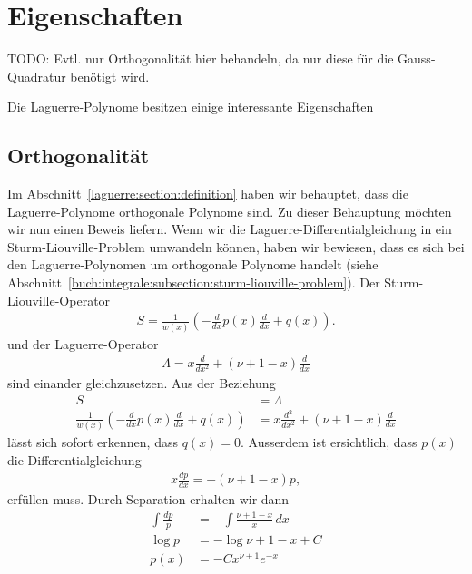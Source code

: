 %
%
%
\section{Eigenschaften
  \label{laguerre:section:eigenschaften}}
{
\large \color{red}
TODO:
Evtl. nur Orthogonalität hier behandeln, da nur diese für die Gauss-Quadratur
benötigt wird.
}

Die Laguerre-Polynome besitzen einige interessante Eigenschaften

\subsection{Orthogonalität
  \label{laguerre:subsection:orthogonal}}
Im Abschnitt~\ref{laguerre:section:definition} haben wir behauptet,
dass die Laguerre-Polynome orthogonale Polynome sind.
Zu dieser Behauptung möchten wir nun einen Beweis liefern.
Wenn wir die Laguerre\--Differentialgleichung in ein
Sturm\--Liouville\--Problem umwandeln können, haben wir bewiesen, dass es sich
bei
den Laguerre\--Polynomen um orthogonale Polynome handelt (siehe
Abschnitt~\ref{buch:integrale:subsection:sturm-liouville-problem}).
Der Sturm-Liouville-Operator
\begin{align}
S
=
\frac{1}{w(x)} \left(-\frac{d}{dx}p(x) \frac{d}{dx} + q(x) \right).
\label{laguerre:slop}
\end{align}
und der Laguerre-Operator
\begin{align}
\Lambda
=
x \frac{d}{dx^2} + (\nu + 1 -x) \frac{d}{dx}
\end{align}
sind einander gleichzusetzen.
Aus der Beziehung
\begin{align}
S
 & =
\Lambda
\nonumber
\\
\frac{1}{w(x)} \left(-\frac{d}{dx}p(x) \frac{d}{dx} + q(x) \right)
 & =
x \frac{d^2}{dx^2} + (\nu + 1 - x) \frac{d}{dx}
\label{laguerre:sl-lag}
\end{align}
lässt sich sofort erkennen, dass $q(x) = 0$.
Ausserdem ist ersichtlich, dass $p(x)$ die Differentialgleichung
\begin{align*}
x \frac{dp}{dx}
=
-(\nu + 1 - x) p,
\end{align*}
erfüllen muss.
Durch Separation erhalten wir dann
\begin{align*}
\int \frac{dp}{p}
 & =
-\int \frac{\nu + 1 - x}{x} \, dx
\\
\log p
 & =
-\log \nu + 1 - x + C
\\
p(x)
 & =
-C x^{\nu + 1} e^{-x}
\end{align*}
